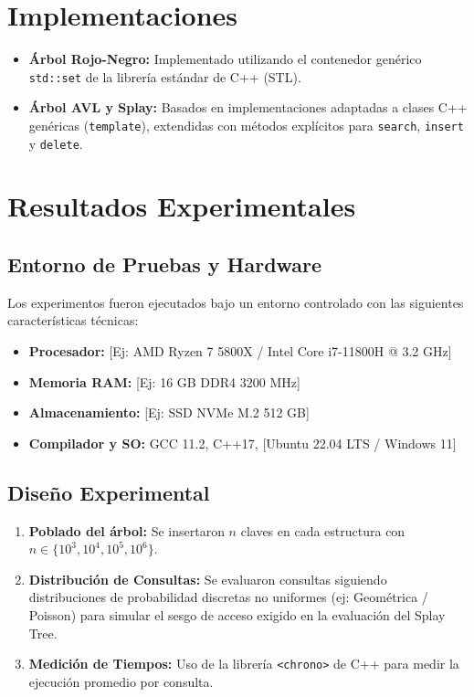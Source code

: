 \documentclass[11pt,a4paper]{article}
\begin{document}
\section{Implementaciones}
\begin{itemize}
    \item \textbf{Árbol Rojo-Negro:} Implementado utilizando el contenedor genérico \texttt{std::set} de la librería estándar de C++ (STL).
    \item \textbf{Árbol AVL y Splay:} Basados en implementaciones adaptadas a clases C++ genéricas (\texttt{template}), extendidas con métodos explícitos para \texttt{search}, \texttt{insert} y \texttt{delete}.
\end{itemize}

\section{Resultados Experimentales}

\subsection{Entorno de Pruebas y Hardware}
Los experimentos fueron ejecutados bajo un entorno controlado con las siguientes características técnicas:
\begin{itemize}
    \item \textbf{Procesador:} [Ej: AMD Ryzen 7 5800X / Intel Core i7-11800H @ 3.2 GHz]
    \item \textbf{Memoria RAM:} [Ej: 16 GB DDR4 3200 MHz]
    \item \textbf{Almacenamiento:} [Ej: SSD NVMe M.2 512 GB]
    \item \textbf{Compilador y SO:} GCC 11.2, C++17, [Ubuntu 22.04 LTS / Windows 11]
\end{itemize}

\subsection{Diseño Experimental}
\begin{enumerate}
    \item \textbf{Poblado del árbol:} Se insertaron $n$ claves en cada estructura con $n \in \{10^3, 10^4, 10^5, 10^6\}$.
    \item \textbf{Distribución de Consultas:} Se evaluaron consultas siguiendo distribuciones de probabilidad discretas no uniformes (ej: Geométrica / Poisson) para simular el sesgo de acceso exigido en la evaluación del Splay Tree.
    \item \textbf{Medición de Tiempos:} Uso de la librería \texttt{<chrono>} de C++ para medir la ejecución promedio por consulta.
\end{enumerate}
\end{document}
